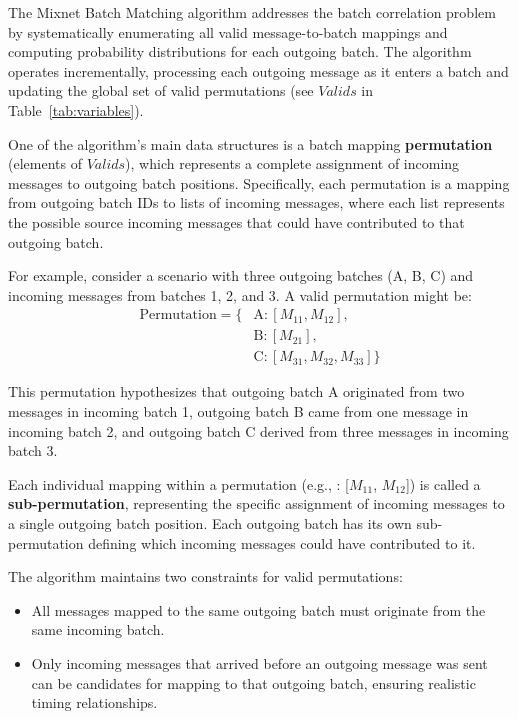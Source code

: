 \documentclass{article}
\begin{document}
The Mixnet Batch Matching algorithm addresses the batch 
correlation problem by systematically enumerating 
all valid message-to-batch mappings and computing 
probability distributions for each outgoing batch. 
The algorithm operates incrementally, processing 
each outgoing message as it enters a batch and 
updating the global set of valid permutations 
(see $Valids$ in Table~\ref{tab:variables}).

One of the algorithm's main data structures is a batch mapping 
\textbf{permutation} (elements of $Valids$), 
which represents a complete assignment of incoming messages to outgoing 
batch positions. Specifically, each permutation is a mapping from 
outgoing batch IDs to lists of incoming messages, where 
each list represents the possible source incoming messages that could 
have contributed to that outgoing batch.

For example, consider a scenario with three outgoing batches (A, B, C) 
and incoming messages from batches 1, 2, and 3. A valid permutation might be:
\begin{align}
\text{Permutation} = \{&\text{A}: [M_{11}, M_{12}], \\
                      &\text{B}: [M_{21}], \\
                      &\text{C}: [M_{31}, M_{32}, M_{33}]\}
\end{align}

This permutation hypothesizes that outgoing batch A originated 
from two messages in incoming batch 1, outgoing batch B came 
from one message in incoming batch 2, and outgoing batch C 
derived from three messages in incoming batch 3.

Each individual mapping within a permutation 
(e.g., : [$M_{11}$, $M_{12}$]) 
is called a \textbf{sub-permutation}, representing the 
specific assignment of incoming messages to a single 
outgoing batch position. Each outgoing batch has its own 
sub-permutation defining which incoming messages could 
have contributed to it.


The algorithm maintains two constraints for valid permutations:

\begin{itemize}
\item All messages mapped to the same outgoing batch must 
originate from the same incoming batch. 

\item Only incoming messages that arrived before an outgoing 
message was sent can be candidates for mapping to that 
outgoing batch, ensuring realistic timing relationships.
\end{itemize}
\end{document}
